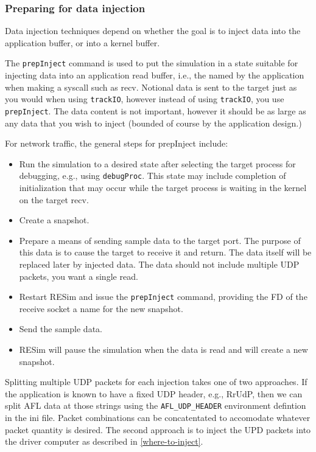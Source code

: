 \documentclass[titlepage]{article}
\begin{document}
\subsubsection{Preparing for data injection}
\label{prepInject}
Data injection techniques depend on whether the goal is to inject data into the application buffer, or into a kernel buffer.

The {\tt prepInject} command is used to put the simulation in a state suitable for injecting data into an application
read buffer, i.e., the named by the application when making a syscall such as recv.  Notional data is sent to the target just as you would when using
{\tt trackIO}, however instead of using {\tt trackIO}, you use {\tt prepInject}.  The data content is not important, however it should be as large as
any data that you wish to inject (bounded of course by the application design.)

For network traffic, the general steps for prepInject include:
\begin{itemize}
\item Run the simulation to a desired state after selecting the target process for debugging, e.g., using {\tt debugProc}.  This state may include
completion of initialization that may occur while the target process is waiting in the kernel on the target recv.
\item Create a snapshot.
\item Prepare a means of sending sample data to the target port.  The purpose of this data is to cause the target to receive it and return.  The
data itself will be replaced later by injected data.  The data should not include multiple UDP packets, you want a single read.
\item Restart RESim and issue the {\tt prepInject} command, providing the FD of the receive socket a name for the new snapshot.
\item Send the sample data.
\item RESim will pause the simulation when the data is read and will create a new snapshot.
\end{itemize}

Splitting multiple UDP packets for each injection takes one of two approaches.  If the application is known
to have a fixed UDP header, e.g., RrUdP, then we can split AFL data at those strings using the {\tt AFL\_UDP\_HEADER} environment
defintion in the ini file.  Packet combinations can be concatentated
to accomodate whatever packet quantity is desired.  The second approach is to inject the UPD packets
into the driver computer as described in  \ref{where-to-inject}.
\end{document}

